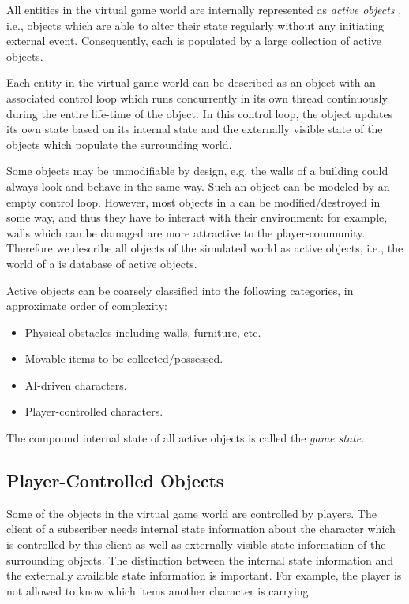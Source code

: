 \documentclass[a4paper, 10pt]{book}
\begin{document}
All entities in the virtual game world are internally represented
as {\em active objects} \cite{schmidt00}, i.e., objects which
are able to alter their state regularly without any initiating 
external event. Consequently, each \MMORG is populated by a large
collection of active objects.

Each entity in the virtual game world can be described as an object with an
associated control loop which runs concurrently in its
own thread continuously during the entire life-time of the object. In
this control loop, the object updates its own state based on its
internal state and the externally visible state of the objects which
populate the surrounding world.

Some objects may be unmodifiable by design, e.g. the walls of a building could
always look and behave in the same way. Such an object can be modeled by an
empty control loop. However, most objects in a \MMORG can be modified/destroyed
in some way, and thus they have to interact with their environment: for
example, walls which can be damaged are more attractive to the
player-community. Therefore we describe all objects of the simulated world as
active objects, i.e., the world of a \MMORG is database of active objects.

Active objects can be coarsely classified into the following categories,
in approximate order of complexity:

\begin{itemize}
    \item Physical obstacles including walls, furniture, etc.
    \item Movable items to be collected/possessed.
    \item AI-driven characters.
    \item Player-controlled characters.
\end{itemize}

The compound internal state of all active objects is called the {\em game
state}.

\subsection{Player-Controlled Objects} 

Some of the objects in the virtual game world are controlled by players.
%
The client of a subscriber needs internal state information about the
character which is controlled by this client as well as externally
visible state information of the surrounding objects. 
%
The distinction between the internal state information and the
externally available state information is important. For example, the
player is not allowed to know which items another character is
carrying.
\end{document}
